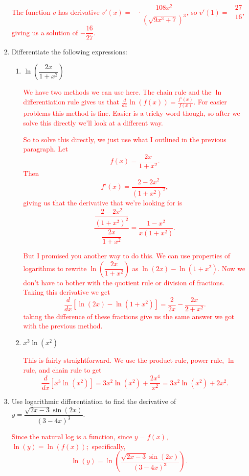 \documentclass[11pt]{article}
\newcommand{\red}{\textcolor{red}}
\begin{document}
\begin{enumerate}
        \red{The function $v$ has derivative $v'(x)=-\cdot\dfrac{108x^2}{(\sqrt{9x^3+7})^{3}}$, so $v'(1)=-\dfrac{27}{16}$, giving us a solution of $-\dfrac{16}{27}$.}
        
        \item Differentiate the following expressions:
        \begin{enumerate}
            \item $\ln\left(\dfrac{2x}{1+x^{2}}\right)$

            \red{We have two methods we can use here. The chain rule and the $\ln$ differentiation rule gives us that $\frac{d}{dx}\ln(f(x))=\frac{f'(x)}{f(x)}$. For easier problems this method is fine. Easier is a tricky word though, so after we solve this directly we'll look at a different way.}

            \red{So to solve this directly, we just use what I outlined in the previous paragraph. Let $$f(x)=\dfrac{2x}{1+x^{2}}.$$ Then $$f'(x)=\frac{2-2x^{2}}{(1+x^{2})^{2}},$$ giving us that the derivative that we're looking for is $$\frac{\dfrac{2-2x^{2}}{(1+x^{2})^{2}}}{\dfrac{2x}{1+x^{2}}}=\frac{1-x^{2}}{x(1+x^{2})}.$$}

            \red{But I promised you another way to do this. We can use properties of logarithms to rewrite $\ln\left(\dfrac{2x}{1+x^{2}}\right)$ as $\ln(2x)-\ln(1+x^{2})$. Now we don't have to bother with the quotient rule or division of fractions. Taking this derivative we get $$\frac{d}{dx}\left[\ln(2x)-\ln(1+x^{2})\right]=\frac{2}{2x}-\frac{2x}{2+x^{2}}.$$ taking the difference of these fractions give us the same answer we got with the previous method.}
            
            \item $x^{3}\ln(x^{2})$

            \red{This is fairly straightforward. We use the product rule, power rule, $\ln$ rule, and chain rule to get $$\frac{d}{dx}\left[x^{3}\ln(x^{2})\right]=3x^{2}\ln(x^{2})+\frac{2x^4}{x^{2}}=3x^{2}\ln(x^{2})+2x^{2}.$$}
            
        \end{enumerate}
        \item Use logarithmic differentiation to find the derivative of $y=\dfrac{\sqrt{2x-3}\sin(2x)}{(3-4x)^{3}}$.
        
            \red{Since the natural log is a function, since $y=f(x)$, $\ln(y)=\ln(f(x));$ specifically, $$\ln(y)=\ln\left(\dfrac{\sqrt{2x-3}\sin(2x)}{(3-4x)^{3}}\right).$$}


\end{enumerate}
\end{document}
